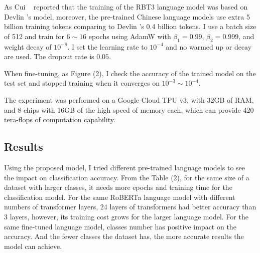 \documentclass[review]{cvpr}
\begin{document}
As Cui \etal~\cite{cui2020revisiting} reported that the training of the RBT3 language model was based on Devlin \etal's model,
moreover, the pre-trained Chinese language models use extra 5 billion training tokens comparing to Devlin \etal's 0.4 billion tokens.
I use a batch size of 512 and train for $6\sim16$ epochs using AdamW with $\beta_1=0.99$, $\beta_2=0.999$, and weight decay of $10^{-8}$.
I set the learning rate to $10^{-4}$ and no warmed up or decay are used.
The dropout rate is $0.05$.

\par When fine-tuning, as Figure (2), I check the accuracy of the trained model on the test set and stopped training when it converges on $10^{-3}\sim10^{-4}$.

\par The experiment was performed on a Google Cloud TPU v3, with 32GB of RAM, and 8 chips with 16GB of the high speed of memory each,
which can provide 420 tera-flops of computation capability.

\subsection{Results}

Using the proposed model, I tried different pre-trained language models to see the impact on classification accuracy.
From the Table (2), for the same size of a dataset with larger classes, it needs more epochs and training time for the classification model.
For the same RoBERTa language model with different numbers of transformer layers, 24 layers of transformers had better accuracy than 3 layers,
however, its training cost grows for the larger language model.
For the same fine-tuned language model, classes number has positive impact on the accuracy.
And the fewer classes the dataset has, the more accurate results the model can achieve.
\end{document}
